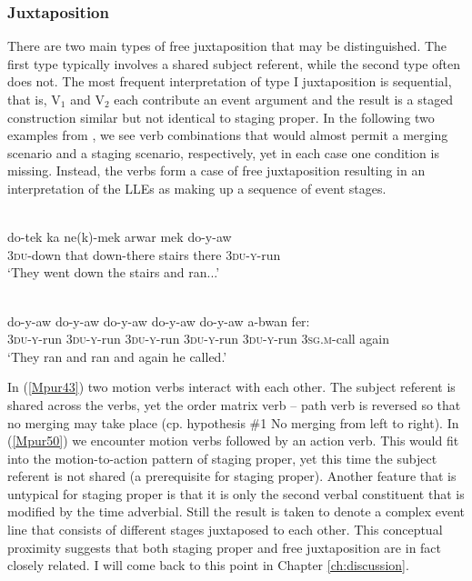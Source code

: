 \subsubsection{Juxtaposition}
\label{sec:juxtaposition}

There are two main types of free juxtaposition that may be distinguished. The first type typically involves a shared subject referent, while the second type often does not. The most frequent interpretation of type I juxtaposition is sequential, that is, V$_1$ and V$_2$ each contribute an event argument and the result is a staged construction similar but not identical to staging proper. In the following two examples from , we see verb combinations that would almost permit a merging scenario and a staging scenario, respectively, yet in each case one condition is missing. Instead, the verbs form a case of free juxtaposition resulting in an interpretation of the LLEs as making up a sequence of event stages.

\ea \label{Mpur43} 
\\
\gll do-tek ka ne(k)-mek arwar mek do-y-aw \\
3\textsc{du}-down that down-there stairs there 3\textsc{du}-\textsc{y}-run \\
\glft `They went down the stairs and ran...' \\ 
\z

\xe
\ea \label{Mpur50}
\\
\gll do-y-aw do-y-aw do-y-aw do-y-aw do-y-aw a-bwan fer: \\
3\textsc{du}-\textsc{y}-run 3\textsc{du}-\textsc{y}-run 3\textsc{du}-\textsc{y}-run 3\textsc{du}-\textsc{y}-run 3\textsc{du}-\textsc{y}-run 3\textsc{sg}.\textsc{m}-call again \\
\glft `They ran and ran and again he called.' \\ 
\z

In (\ref{Mpur43}) two motion verbs interact with each other. The subject referent is shared across the verbs, yet the order matrix verb -- path verb is reversed so that no merging may take place (cp. hypothesis \#1 No merging from left to right). In (\ref{Mpur50}) we encounter motion verbs followed by an action verb. This would fit into the motion-to-action pattern of staging proper, yet this time the subject referent is not shared (a prerequisite for staging proper). Another feature that is untypical for staging proper is that it is only the second verbal constituent that is modified by the time adverbial. Still the result is taken to denote a complex event line that consists of different stages juxtaposed to each other. This conceptual proximity suggests that both staging proper and free juxtaposition are in fact closely related. I will come back to this point in Chapter \ref{ch:discussion}.

